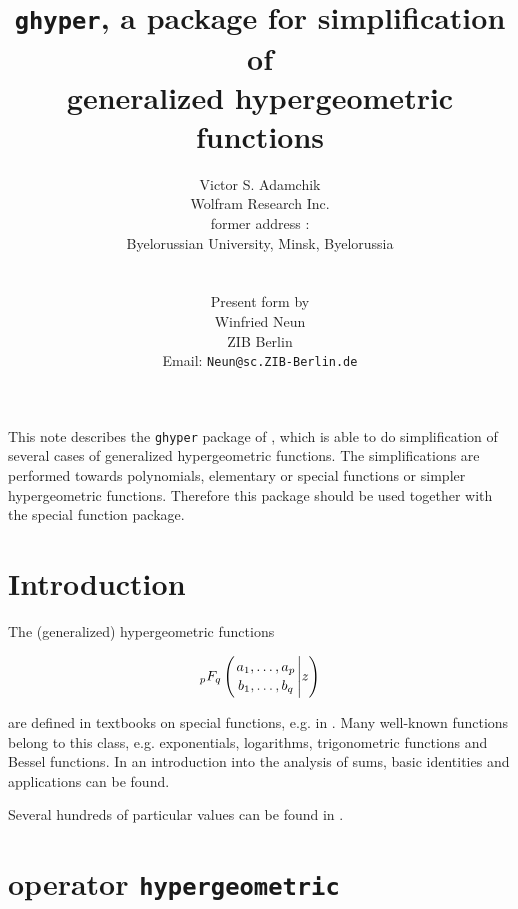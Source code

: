 \title{{\tt ghyper}, a package for simplification of \\
generalized hypergeometric functions}
\date{}
\author{Victor S. Adamchik\\
        Wolfram Research Inc. \\
        former address : \\
        Byelorussian University, Minsk, Byelorussia\\
\\
\\
        Present \REDUCE{} form by \\
        Winfried Neun \\
        ZIB Berlin \\
        Email: {\tt Neun@sc.ZIB-Berlin.de}}

\maketitle

This note describes the {\tt ghyper} package of \REDUCE{}, which is able
to do simplification of several cases of generalized hypergeometric functions.
The simplifications are performed towards polynomials, elementary or
special functions or simpler hypergeometric functions.
Therefore this package should be used together with the \REDUCE{}
special function package.

\section{Introduction}

The (generalized) hypergeometric functions

\begin{displaymath}
_pF_q \left( {{a_1, \ldots , a_p} \atop {b_1, \ldots ,b_q}} \Bigg\vert z \right)
\end{displaymath}

are defined in textbooks on special functions, e.g. in
\cite{Prudnikov:90}. Many well-known functions belong to this class,
e.g. exponentials, logarithms, trigonometric functions and Bessel functions.
In \cite{Graham:89} an introduction into the analysis of sums, basic
identities and applications can be found.

Several hundreds of particular values can be found in \cite{Prudnikov:90}.

\section{\REDUCE{} operator {\tt hypergeometric}}

